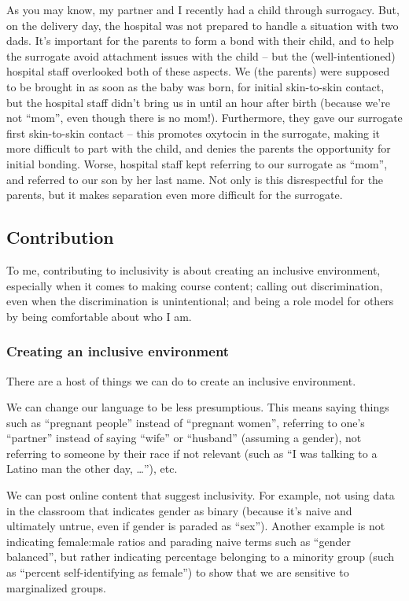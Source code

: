 \documentclass[]{article}
\begin{document}
As you may know, my partner and I recently had a child through surrogacy. But, on the delivery day, the hospital was not prepared to handle a situation with two dads. It's important for the parents to form a bond with their child, and to help the surrogate avoid attachment issues with the child -- but the (well-intentioned) hospital staff overlooked both of these aspects. We (the parents) were supposed to be brought in as soon as the baby was born, for initial skin-to-skin contact, but the hospital staff didn't bring us in until an hour after birth (because we're not ``mom'', even though there is no mom!). Furthermore, they gave our surrogate first skin-to-skin contact -- this promotes oxytocin in the surrogate, making it more difficult to part with the child, and denies the parents the opportunity for initial bonding. Worse, hospital staff kept referring to our surrogate as ``mom'', and referred to our son by her last name. Not only is this disrespectful for the parents, but it makes separation even more difficult for the surrogate.

\hypertarget{contribution}{%
\subsection{Contribution}\label{contribution}}

To me, contributing to inclusivity is about creating an inclusive environment, especially when it comes to making course content; calling out discrimination, even when the discrimination is unintentional; and being a role model for others by being comfortable about who I am.

\hypertarget{creating-an-inclusive-environment}{%
\subsubsection{Creating an inclusive environment}\label{creating-an-inclusive-environment}}

There are a host of things we can do to create an inclusive environment.

We can change our language to be less presumptious. This means saying things such as ``pregnant people'' instead of ``pregnant women'', referring to one's ``partner'' instead of saying ``wife'' or ``husband'' (assuming a gender), not referring to someone by their race if not relevant (such as ``I was talking to a Latino man the other day, \ldots{}''), etc.

We can post online content that suggest inclusivity. For example, not using data in the classroom that indicates gender as binary (because it's naive and ultimately untrue, even if gender is paraded as ``sex''). Another example is not indicating female:male ratios and parading naive terms such as ``gender balanced'', but rather indicating percentage belonging to a minority group (such as ``percent self-identifying as female'') to show that we are sensitive to marginalized groups.
\end{document}
